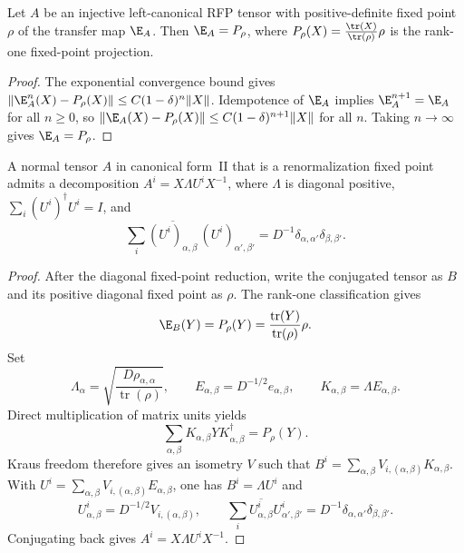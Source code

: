 \begin{theorem}%
    \label{thm:transferMap_eq_fixedPointProj_of_isTransferIdempotent_injective}
    \leanok
    Let $A$ be an injective left-canonical RFP tensor with positive-definite
    fixed point $\rho$ of the transfer map $\E_A$. Then
    $\E_A = P_\rho$, where $P_\rho(X) = \frac{\tr(X)}{\tr(\rho)} \rho$
    is the rank-one fixed-point projection.
\end{theorem}
\begin{proof}\leanok
    The exponential convergence bound gives
    $\lVert \E_A^n(X) - P_\rho(X)\rVert \le C(1-\delta)^n\lVert X\rVert$.
    Idempotence of $\E_A$ implies $\E_A^{n+1} = \E_A$ for all $n \ge 0$,
    so $\lVert \E_A(X) - P_\rho(X)\rVert \le C(1-\delta)^{n+1}\lVert X\rVert$
    for all $n$. Taking $n \to \infty$ gives $\E_A = P_\rho$.
\end{proof}

\begin{theorem}%
    \label{thm:rfp_nt_structural_full}
    \leanok
    A normal tensor $A$ in canonical form~II that is a renormalization fixed
    point admits a decomposition $A^i = X \Lambda U^i X^{-1}$, where
    $\Lambda$ is diagonal positive, $\sum_i (U^i)^\dagger U^i=I$, and
    \[
        \sum_i \overline{(U^i)_{\alpha,\beta}}\,
        (U^i)_{\alpha',\beta'}
        =
        D^{-1}\delta_{\alpha,\alpha'}\delta_{\beta,\beta'} .
    \]
\end{theorem}
\begin{proof}\leanok
    After the diagonal fixed-point reduction, write the conjugated tensor as
    $B$ and its positive diagonal fixed point as $\rho$.  The rank-one
    classification gives
    \[
        \E_B(Y)=P_\rho(Y)
        =\frac{\operatorname{tr}(Y)}{\operatorname{tr}(\rho)}\rho.
    \]
    Set
    \[
        \Lambda_\alpha
          =\sqrt{\frac{D\rho_{\alpha,\alpha}}{\operatorname{tr}(\rho)}},
        \qquad
        E_{\alpha,\beta}=D^{-1/2}e_{\alpha,\beta},
        \qquad
        K_{\alpha,\beta}=\Lambda E_{\alpha,\beta}.
    \]
    Direct multiplication of matrix units yields
    \[
        \sum_{\alpha,\beta}K_{\alpha,\beta}Y
        K_{\alpha,\beta}^{\dagger}=P_\rho(Y).
    \]
    Kraus freedom therefore gives an isometry $V$ such that
    $B^i=\sum_{\alpha,\beta}V_{i,(\alpha,\beta)}K_{\alpha,\beta}$.
    With
    $U^i=\sum_{\alpha,\beta}V_{i,(\alpha,\beta)}E_{\alpha,\beta}$,
    one has $B^i=\Lambda U^i$ and
    \[
        U^i_{\alpha,\beta}=D^{-1/2}V_{i,(\alpha,\beta)},
        \qquad
        \sum_i\overline{U^i_{\alpha,\beta}}U^i_{\alpha',\beta'}
        =D^{-1}\delta_{\alpha,\alpha'}\delta_{\beta,\beta'}.
    \]
    Conjugating back gives $A^i=X\Lambda U^iX^{-1}$.
\end{proof}

